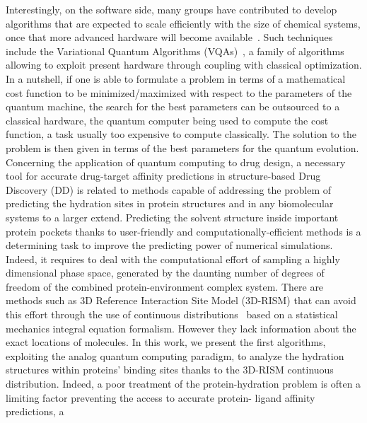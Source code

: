 \documentclass[fleqn,10pt]{wlscirep}
\begin{document}
Interestingly, on the software side, many groups have contributed to develop algorithms that are expected to scale efficiently with the size of chemical systems, once that more advanced hardware will become available~\cite{ChemRev_AG2019,RevModPhys.92.015003}. Such techniques include the Variational Quantum Algorithms (VQAs)~\cite{RevModPhys.94.015004,Cerezo2021}, a family of algorithms allowing to exploit present hardware through coupling with classical optimization. In a nutshell, if one is able to formulate a problem in terms of a mathematical cost function to be minimized/maximized with respect to the parameters of the quantum machine, the search for the best parameters can be outsourced to a classical hardware, the quantum computer being used to compute the cost function, a task usually too expensive to compute classically. The solution to the problem is then given in terms of the best parameters for the quantum evolution. 
Concerning the application of quantum computing to drug design, a necessary tool for accurate drug-target affinity predictions in structure-based Drug Discovery (DD) is related to methods capable of addressing the problem of predicting the hydration sites in protein structures and in any biomolecular systems to a larger extend. Predicting the solvent structure inside important protein pockets thanks to user-friendly and computationally-efficient methods is a determining task to improve the predicting power of numerical simulations. Indeed, it requires to deal with the computational effort of sampling a highly dimensional phase space, generated by the daunting number of degrees of freedom of the combined protein-environment complex system. There are methods such as 3D Reference Interaction Site Model (3D-RISM) that can avoid this effort through the use of continuous distributions~\cite{chandler_optimized_1972,chandler_derivation_1973,chandler_equilibrium_1974,beglov_integral_1997,kovalenko_three-dimensional_2003,roy_biomolecular_2021} based on a statistical mechanics integral equation formalism.  However they lack information about the exact locations of molecules.
In this work, we present the first algorithms, exploiting the analog quantum computing paradigm, to analyze the hydration structures within proteins’
binding sites thanks to the 3D-RISM continuous distribution. Indeed, a poor treatment of the protein-hydration problem is often a limiting factor preventing the access to accurate protein-
ligand affinity predictions, a
\end{document}
